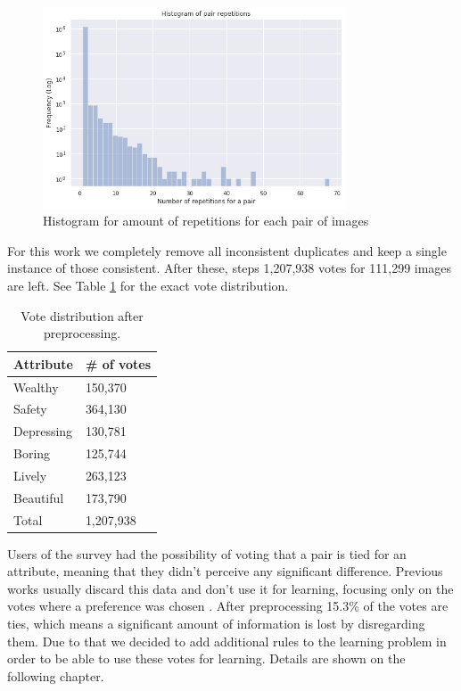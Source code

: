 \begin{figure}[ht]
	\begin{center}
	\includegraphics[width=0.8\textwidth]{./figures/rep_hist.png}
	\caption[Repetition histogram]{ Histogram for amount of repetitions for each pair of images }
	\label{fig:rep_hist}
	\end{center}
\end{figure}

For this work we completely remove all inconsistent duplicates and keep a single instance of those consistent.
After these, steps 1,207,938 votes for 111,299 images are left. See Table \ref{tab:votes}
for the exact vote distribution.

\begin{table}[H]
	\begin{center}
	\caption[Votes Distribution]{ Vote distribution after preprocessing.}
	\begin{tabular}{ll}
		\hline
		\textbf{Attribute} & \textbf{\# of votes} \\ \hline
		Wealthy            & 150,370               \\
		Safety             & 364,130               \\
		Depressing         & 130,781               \\
		Boring             & 125,744               \\
		Lively             & 263,123               \\
		Beautiful          & 173,790               \\ \hline
		Total              & 1,207,938            \\
	\end{tabular}
	\label{tab:votes}
	\end{center}
\end{table}

Users of the survey had the possibility of voting that a pair is tied for an attribute,
meaning that they didn't perceive any significant difference. Previous works usually
discard this data and don't use it for learning, focusing only on the votes where a preference was
chosen \cite{hidalgo_placepulse,zhang_measuring,tamara_judgments}. After preprocessing 15.3\% of the
votes are ties, which means a significant amount of information is lost by disregarding them.
Due to that we decided to add additional rules to the learning problem in order to be able to use
these votes for learning. Details are shown on the following chapter.